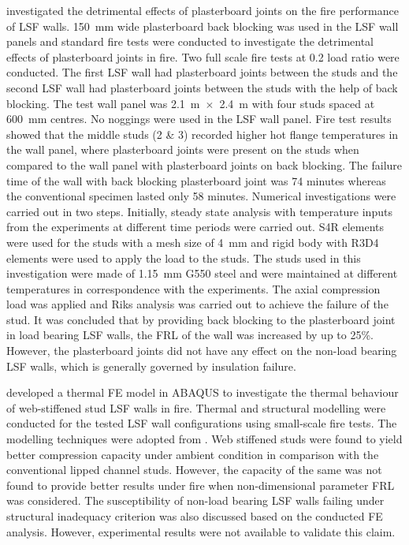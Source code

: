 \citet{Ariyanayagam2016} investigated the detrimental effects of plasterboard joints on the fire performance of LSF walls. 150~mm wide plasterboard back blocking was used in the LSF wall panels and standard fire tests were conducted to investigate the detrimental effects of plasterboard joints in fire. Two full scale fire tests at 0.2 load ratio were conducted. The first LSF wall had plasterboard joints between the studs and the second LSF wall had plasterboard joints between the studs with the help of back blocking. The test wall panel was 2.1~m~$\times$~2.4~m with four studs spaced at 600~mm centres. No noggings were used in the LSF wall panel. Fire test results showed that the middle studs (2 \& 3) recorded higher hot flange temperatures in the wall panel, where plasterboard joints were present on the studs when compared to the wall panel with plasterboard joints on back blocking. The failure time of the wall with back blocking plasterboard joint was 74 minutes whereas the conventional specimen lasted only 58 minutes. Numerical investigations were carried out in two steps. Initially, steady state analysis with temperature inputs from the experiments at different time periods were carried out. S4R elements were used for the studs with a mesh size of 4~mm and rigid body with R3D4 elements were used to apply the load to the studs. The studs used in this investigation were made of 1.15~mm G550 steel and were maintained at different temperatures in correspondence with the experiments. The axial compression load was applied and Riks analysis was carried out to achieve the failure of the stud. It was concluded that by providing back blocking to the plasterboard joint in load bearing LSF walls, the FRL of the wall was increased by up to 25\%. However, the plasterboard joints did not have any effect on the non-load bearing LSF walls, which is generally governed by insulation failure.

\citet{Dias2018} developed a thermal FE model in ABAQUS to investigate the thermal behaviour of web-stiffened stud LSF walls in fire. Thermal and structural modelling were conducted for the tested LSF wall configurations using small-scale fire tests. The modelling techniques were adopted from \citet{Rusthi2017}. Web stiffened studs were found to yield better compression capacity under ambient condition in comparison with the conventional lipped channel studs. However, the capacity of the same was not found to provide better results under fire when non-dimensional parameter FRL was considered. The susceptibility of non-load bearing LSF walls failing under structural inadequacy criterion was also discussed based on the conducted FE analysis. However, experimental results were not available to validate this claim. 

